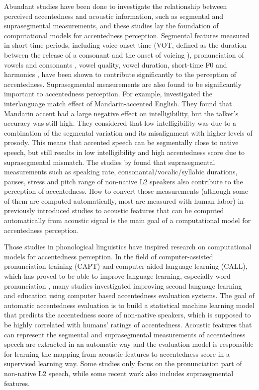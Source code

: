 Abundant studies have been done to investigate the relationship between perceived accentedness and acoustic information, such as segmental and suprasegmental measurements, and these studies lay the foundation of computational models for accentedness perception. Segmental features measured in short time periods, including voice onset time (VOT, defined as the duration between the release of a consonant and the onset of voicing )\citep{lisker1964cross,mccullough2013perceived,mccullough2013perceived}, pronunciation of vowels and consonants \citep{flege1995second,deterding2006pronunciation,sangwan2012automatic}, vowel quality, vowel duration, short-time F0 and harmonics  \citep{mccullough2013acoustic, mccullough2013perceived}, have been shown to contribute significantly to the perception of accentedness. Suprasegmental measurements are also found to be significantly important to accentedness perception. For example, \cite{hardman2014accentedness} investigated the interlanguage match effect of Mandarin-accented English. They found that Mandarin accent had a large negative effect on intelligibility, but the talker's accuracy was still high. They considered that low intelligibility was due to a combination of the segmental variation and its misalignment with higher levels of prosody. This means that accented speech can be segmentally close to native speech, but still results in low intelligibility and high accentedness score due to suprasegmental mismatch. The studies by \cite{munro2001modeling, mok2008comparing, kang2010relative} found that suprasegmental measurements such as speaking rate, consonantal/vocalic/syllabic durations, pauses, stress and pitch range of non-native L2 speakers also contribute to the perception of accentedness. How to convert those measurements (although some of them are computed automatically, most are measured with human labor) in previously introduced studies to acoustic features that can be computed automatically from acoustic signal is the main goal of a computational model for accentedness perception.

Those studies in phonological linguistics have inspired research on computational models for accentedness perception. In the field of computer-assisted pronunciation training (CAPT) and computer-aided language learning (CALL), which has proved to be able to improve language learning, especially word pronunciation \citep{neri2008effectiveness}, many studies investigated improving second language learning and education using computer based accentedness evaluation systems. The goal of automatic accentedness evaluation is to build a statistical machine learning model that predicts the accentedness score of non-native speakers, which is supposed to be highly correlated with humans' ratings of accentedness. Acoustic features that can represent the segmental and suprasegmental measurements of accentedness speech are extracted in an automatic way and the evaluation model is responsible for learning the mapping from acoustic features to accentedness score in a supervised learning way. Some studies only focus on the pronunciation part of non-native L2 speech, while some recent work also includes suprasegmental features.


